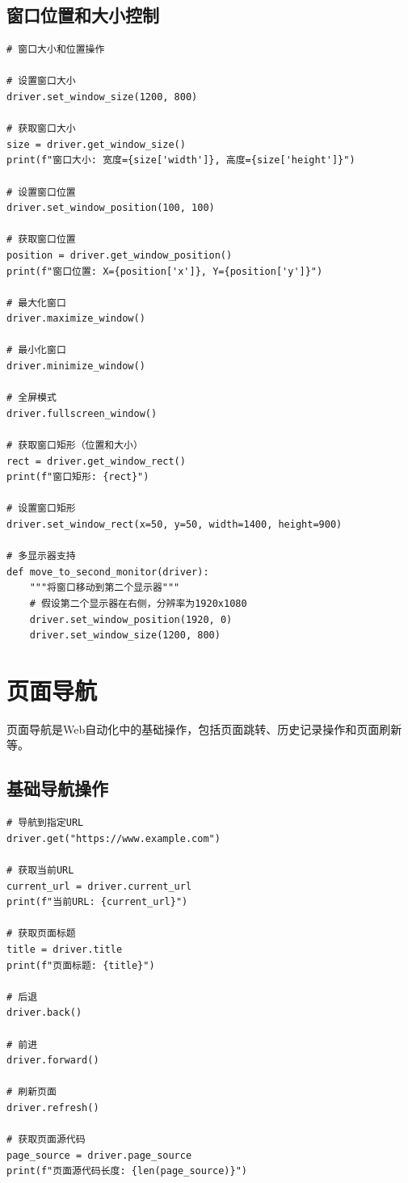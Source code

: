 \subsection{窗口位置和大小控制}

\begin{lstlisting}[style=demostyle,numbers=none]
# 窗口大小和位置操作

# 设置窗口大小
driver.set_window_size(1200, 800)

# 获取窗口大小
size = driver.get_window_size()
print(f"窗口大小: 宽度={size['width']}, 高度={size['height']}")

# 设置窗口位置
driver.set_window_position(100, 100)

# 获取窗口位置
position = driver.get_window_position()
print(f"窗口位置: X={position['x']}, Y={position['y']}")

# 最大化窗口
driver.maximize_window()

# 最小化窗口
driver.minimize_window()

# 全屏模式
driver.fullscreen_window()

# 获取窗口矩形（位置和大小）
rect = driver.get_window_rect()
print(f"窗口矩形: {rect}")

# 设置窗口矩形
driver.set_window_rect(x=50, y=50, width=1400, height=900)

# 多显示器支持
def move_to_second_monitor(driver):
    """将窗口移动到第二个显示器"""
    # 假设第二个显示器在右侧，分辨率为1920x1080
    driver.set_window_position(1920, 0)
    driver.set_window_size(1200, 800)
\end{lstlisting}

\section{页面导航}

页面导航是Web自动化中的基础操作，包括页面跳转、历史记录操作和页面刷新等。

\subsection{基础导航操作}

\begin{lstlisting}[style=demostyle,numbers=none]
# 导航到指定URL
driver.get("https://www.example.com")

# 获取当前URL
current_url = driver.current_url
print(f"当前URL: {current_url}")

# 获取页面标题
title = driver.title
print(f"页面标题: {title}")

# 后退
driver.back()

# 前进
driver.forward()

# 刷新页面
driver.refresh()

# 获取页面源代码
page_source = driver.page_source
print(f"页面源代码长度: {len(page_source)}")
\end{lstlisting}

